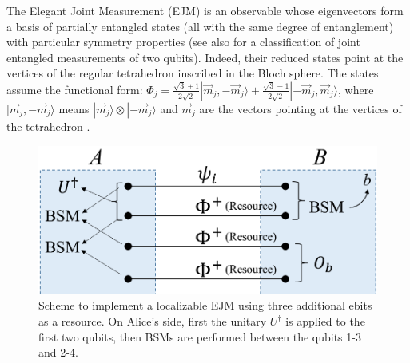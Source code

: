 \documentclass[12pt]{article}
\newcommand{\ket}[1]{| {#1} \rangle} %
\begin{document}
The Elegant Joint Measurement
(EJM) is an observable whose eigenvectors form a basis of partially entangled states (all with the same degree of entanglement) with particular symmetry properties
\cite{gisin2019entanglement} (see also \cite{del2023iso} for a classification of joint entangled measurements of two qubits). Indeed, their reduced states point at the vertices of the regular tetrahedron inscribed in the Bloch sphere. The states assume the functional form: $\Phi_j=\frac{\sqrt{3}+1}{2\sqrt{2}}\ket{\Vec{m}_j,-\Vec{m}_j} +\frac{\sqrt{3}-1}{2\sqrt{2}}\ket{-\Vec{m}_j,\Vec{m}_j}$, where $\ket{\Vec{m}_j,-\Vec{m}_j}$ means $\ket{\Vec{m}_j}\otimes\ket{-\Vec{m}_j}$ and $\Vec{m}_j$ are the vectors pointing at the vertices of the tetrahedron \cite{gisin2019entanglement}. %
 \begin{figure}[ht]
    \centering
    \includegraphics[width=.48\textwidth]{ejm.png}
    \caption{Scheme to implement a localizable EJM using three  additional ebits as a resource. On Alice's side, first the unitary $U^\dagger$ is applied to the first two qubits, then BSMs are performed between the qubits 1-3 and 2-4.}
    \label{fig5}
\end{figure}
\end{document}
